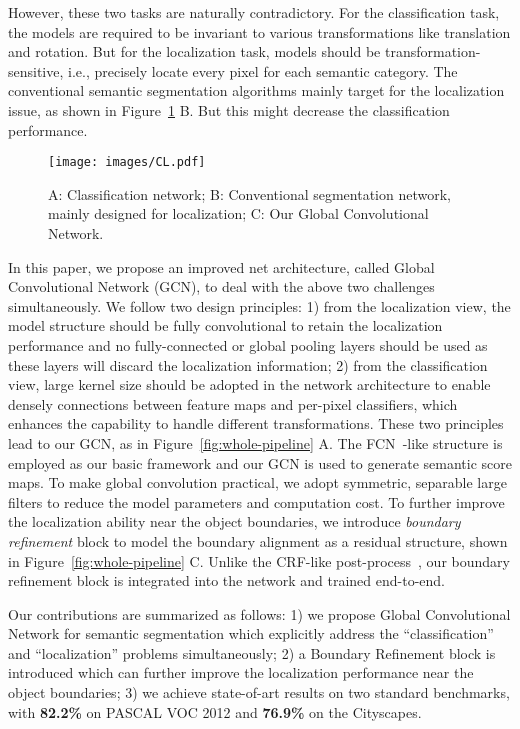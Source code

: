 \documentclass[10pt,twocolumn,letterpaper]{article}
\begin{document}
However, these two tasks are naturally contradictory. For the classification task, the models are required to be invariant to various transformations like translation and rotation. But for the localization task, models should be transformation-sensitive, i.e., precisely locate every pixel for each semantic category. The conventional semantic segmentation algorithms mainly target for the localization issue, as shown in Figure~\ref{fig:two-network} B. But this might decrease the classification performance.
   \begin{figure}[t]
      \begin{center}
         \texttt{[image: images/CL.pdf]}
      \end{center}
      \caption{A: Classification network; B: Conventional segmentation network, mainly designed for localization; C: Our Global Convolutional Network. }
      \label{fig:two-network}
   \end{figure}

In this paper, we propose an improved net architecture, called Global Convolutional Network (GCN), to deal with the above two challenges simultaneously. We follow two design principles: 1) from the localization view, the model structure should be fully convolutional to retain the localization performance and no fully-connected or global pooling layers should be used as these layers will discard the localization information; 2) from the classification view, large kernel size should be adopted in the network architecture to enable densely connections between feature maps and per-pixel classifiers, which enhances the capability to handle different transformations. These two principles lead to our GCN, as in Figure~\ref{fig:whole-pipeline} A. The FCN~\cite{long2015fully}-like structure is employed as our basic framework and our GCN is used to generate semantic score maps. To make global convolution practical, we adopt symmetric, separable large filters to reduce the model parameters and computation cost. To further improve the localization ability near the object boundaries, we introduce \emph{boundary refinement} block to model the boundary alignment as a residual structure, shown in Figure~\ref{fig:whole-pipeline} C. Unlike the CRF-like post-process~\cite{chen14semantic}, our boundary refinement block is integrated into the network and trained end-to-end.

Our contributions are summarized as follows: 1) we propose Global Convolutional Network for semantic segmentation which explicitly address the ``classification'' and ``localization'' problems simultaneously; 2) a Boundary Refinement block is introduced which can further improve the localization performance near the object boundaries; 3) we achieve state-of-art results on two standard benchmarks, with \textbf{82.2\%} on PASCAL VOC 2012 and \textbf{76.9\%} on the Cityscapes.
\end{document}
